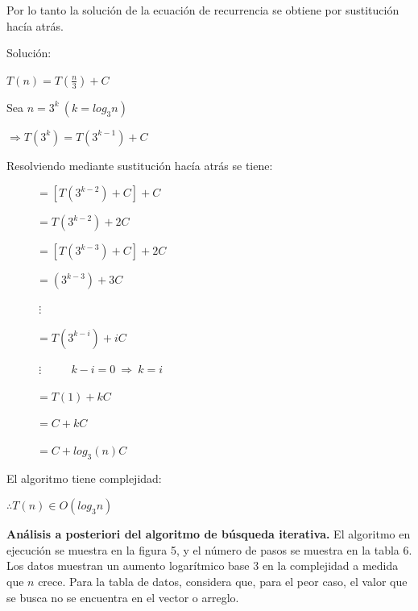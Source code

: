 \documentclass[12pt,twoside]{article}
\begin{document}
  Por lo tanto la solución de la ecuación de recurrencia se obtiene por sustitución hacía atrás. 
  
  Solución:


  $T(n)=T(\frac{n}{3})+C$

  Sea $n=3^k\ (k=log_3 n)$
  
  $\Rightarrow T(3^k)=T(3^{k-1})+C$
  \par
Resolviendo mediante sustitución hacía atrás se tiene:

  $\ \ \ \ \ \ \ \ \ \ \ \ =[T(3^{k-2})+C]+C$

  $\ \ \ \ \ \ \ \ \ \ \ \ =T(3^{k-2})+2C$

  $\ \ \ \ \ \ \ \ \ \ \ \ =[T(3^{k-3})+C]+2C$

  $\ \ \ \ \ \ \ \ \ \ \ \ =(3^{k-3})+3C$

  $\ \ \ \ \ \ \ \ \ \ \ \ \ \vdots$

  $\ \ \ \ \ \ \ \ \ \ \ \ =T(3^{k-i})+iC$

  $\ \ \ \ \ \ \ \ \ \ \ \ \ \vdots \ \ \ \ \ \ \ \  \ \ \ \ k-i=0\ \Rightarrow \ k=i$
  

  $\ \ \ \ \ \ \ \ \ \ \ \ =T(1)+kC$

  $\ \ \ \ \ \ \ \ \ \ \ \ =C+kC$

  $\ \ \ \ \ \ \ \ \ \ \ \ =C+log_3(n)C$

\par

  El algoritmo tiene complejidad:
\begin{center}
  $\therefore T(n)\in O(log_3n)$ 
\end{center}
  

\newpage
\textbf{Análisis a posteriori del algoritmo de búsqueda iterativa.}
El algoritmo en ejecución se muestra en la figura 5, y el número de pasos se muestra en la tabla 6. Los datos muestran un aumento logarítmico base 3 en la complejidad a medida que $n$ crece. Para la tabla de datos, considera que, para el peor caso, el valor que se busca no se encuentra en el vector o arreglo.
\par
\end{document}
